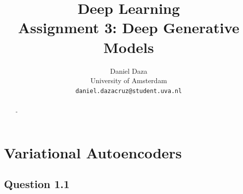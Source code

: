 \documentclass{article}
\title{Deep Learning\\Assignment 3: Deep Generative Models}
\author{%
  Daniel Daza\\
  University of Amsterdam\\
  \texttt{daniel.dazacruz@student.uva.nl} \\
}
\begin{document}

\maketitle

\begin{abstract}
-
\end{abstract}


\section{Variational Autoencoders}

\subsection*{Question 1.1}
\end{document}
